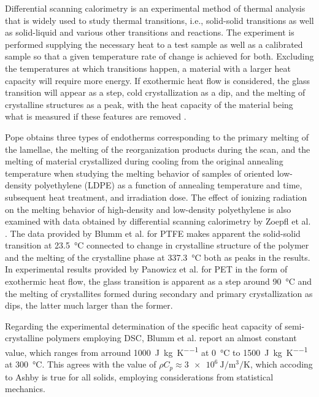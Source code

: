 Differential scanning calorimetry is an experimental method of thermal analysis that is widely used to study thermal transitions, i.e., solid-solid transitions as well as solid-liquid and various other transitions and reactions.
The experiment is performed supplying the necessary heat to a test sample as well as a calibrated sample so that a given temperature rate of change is achieved for both.
Excluding the temperatures at which transitions happen, a material with a larger heat capacity will require more energy.
If exothermic heat flow is considered, the glass transition will appear as a step, cold crystallization as a dip, and the melting of crystalline structures as a peak, with the heat capacity of the material being what is measured if these features are removed \citep{lukasDifferentialScanningCalorimetry2009}.

Pope \citep{popeCharacterizationOrientedLowdensity1976} obtains three types of endotherms corresponding to the primary melting of the lamellae, the melting of the reorganization products during the scan, and the melting of material crystallized during cooling from the original annealing temperature when studying the melting behavior of samples of oriented low-density polyethylene (LDPE) as a function of annealing temperature and time, subsequent heat treatment, and irradiation dose.
The effect of ionizing radiation on the melting behavior of high-density and low-density
polyethylene is also examined with data obtained by differential scanning calorimetry by Zoepfl et al. \citep{zoepflDifferentialScanningCalorimetry1984}.
The data provided by Blumm et al. \citep{blummCharacterizationPTFEUsing2010} for PTFE makes apparent the solid-solid transition at \SI{23.5}{\celsius} connected to change in crystalline structure of the polymer and the melting of the crystalline phase at \SI{337.3}{\celsius} both as peaks in the results.
In experimental results provided by Panowicz et al. \citep{panowiczPropertiesPolyethyleneTerephthalate2021} for PET in the form of exothermic heat flow, the glass transition is apparent as a step around \SI{90}{\celsius} and the melting of crystallites formed during secondary and primary crystallization as dips, the latter much larger than the former.

Regarding the experimental determination of the specific heat capacity of semi-crystalline polymers employing DSC, Blumm et al. \citep{blummCharacterizationPTFEUsing2010} report an almost constant value, which ranges from arround \SI{1000}{\joule\per\kilo\gram\per\kelvin} at \SI{0}{\celsius} to \SI{1500}{\joule\per\kilo\gram\per\kelvin} at \SI{300}{\celsius}.
This agrees with the value of $\rho C_p \approx \SI{3e6}{\joule\per\meter\cubed\per\kelvin}$, which accoding to Ashby \citep{ashbyMaterialsSelectionMechanical1999} is true for all solids, employing considerations from statistical mechanics.

